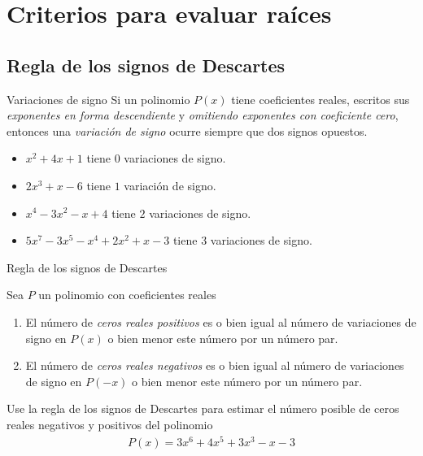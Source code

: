 \section{Criterios para evaluar raíces}

\subsection{Regla de los signos de Descartes}

{Variaciones de signo}
Si un polinomio $P(x)$ tiene coeficientes reales, escritos sus \emph{exponentes en forma descendiente} y \emph{omitiendo exponentes con coeficiente cero}, entonces una \emph{variación de signo} ocurre siempre que dos signos opuestos. 


{}
\begin{problema}
\begin{itemize}
\item $x^{2}+4x+1$ tiene $0$ variaciones de signo.
\item $2x^{3}+x-6$ tiene $1$ variación de signo.
\item $x^{4}-3x^{2}-x+4$ tiene $2$ variaciones de signo.
\item $5x^{7}-3x^{5}-x^{4}+2x^{2}+x-3$ tiene  $3$ variaciones de signo.
\end{itemize}

\end{problema}


{Regla de los signos de Descartes}
\begin{proposicion}
Sea $P$ un polinomio con coeficientes reales
\begin{enumerate}
\item El número de \emph{ceros reales positivos} es o bien igual al número de variaciones de signo en $P(x)$ o bien menor este número por un número par. 
\item El número de \emph{ceros reales negativos} es o bien igual al número de variaciones de signo en $P(-x)$ o bien menor este número por un número par. 
\end{enumerate}

\end{proposicion}


{}
\begin{problema}
Use la regla de los signos de Descartes para estimar el número posible de ceros reales negativos y positivos del polinomio
\begin{align*}
P(x)= 3x^{6}+4x^{5}+3x^{3}-x-3
\end{align*}

\end{problema}

